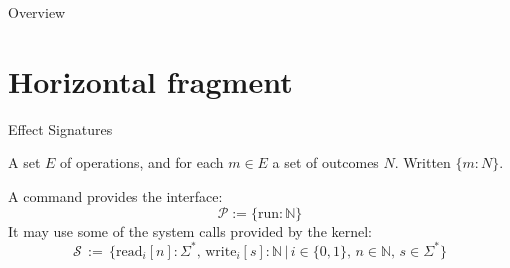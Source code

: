 \documentclass[aspectratio=1610,mathserif]{beamer}
\newcommand{\kw}[1]{\ensuremath{ \mathrm{#1} }}
\begin{document}
\begin{frame}{Overview}
\tableofcontents
\end{frame}

\section{Horizontal fragment}


\begin{frame}{Effect Signatures} %

  \begin{definition}
    A set $E$ of operations, and for each $m \in E$ a set of outcomes $N$.
    Written $\{ m : N \}$.
  \end{definition}

  \pause
  \begin{example}
    A command provides the interface:
    \[ \mathcal{P} :=  \{ \kw{run} : \mathbb{N} \} \]
    \pause
    It may use some of the system calls provided by the kernel:
    \[
      \mathcal{S} \, := \, \bigl\{
      \kw{read}_i[n] \mathbin: \Sigma^* , \,
      \kw{write}_i[s] \mathbin: \mathbb{N} \, \mathrel{\big|} \,
      i \in \{0,1\}, \,
      n \in \mathbb{N}, \,
      s \in \Sigma^*
      \bigr\}
    \]
  \end{example}
\end{frame}
\end{document}
